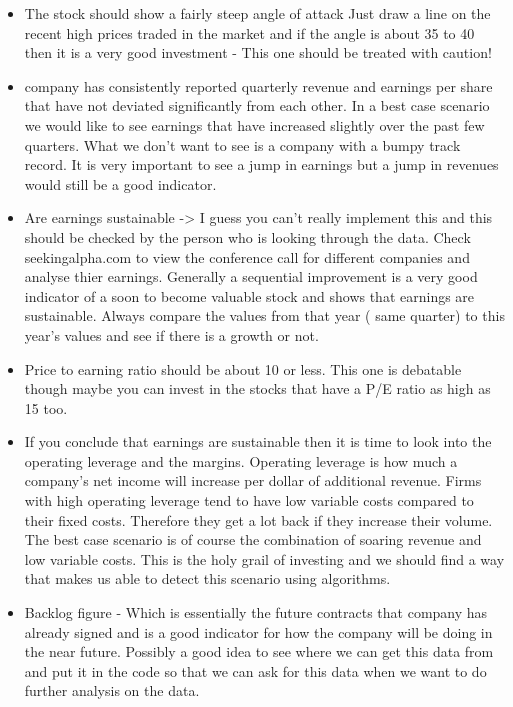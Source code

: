 \documentclass[12 pt]{article}
\begin{document}
\begin{itemize}
\item The stock  should show a fairly steep angle of attack 
Just draw a line on the recent high prices traded in the market and if the angle is about 35 to 40 then it is a very good investment - This one should be treated with caution!

\item company has consistently reported quarterly revenue and earnings per share that have not deviated significantly from each other. In a best case scenario we would like to see earnings that have increased slightly over the past few quarters.  What we don't want to see is a company with a bumpy track record. It is very important to see a jump in earnings but a jump in revenues would still be a good indicator.

\item Are earnings sustainable -> I guess you can’t really implement this and this should be checked by the person who is looking through the data.  Check seekingalpha.com to view the conference call for different companies and analyse thier earnings. Generally a sequential improvement is a very good indicator of a soon to become valuable stock and shows that earnings are sustainable. Always compare the values from that year ( same quarter) to this year’s values and see if there is a growth or not. 
\item Price to earning ratio should be about 10 or less. This one is debatable though maybe you can invest in the stocks that have a P/E ratio as high as 15 too.
\item If you conclude that earnings are sustainable then  it is time to look into the operating leverage and the margins. Operating leverage is how much a company's net income will increase per dollar of additional revenue. Firms with high operating leverage tend to have low variable costs compared to their fixed costs. Therefore they get a lot back if they increase their volume. The best case scenario is of course the combination of soaring revenue and low variable costs. This is the holy grail of investing and we should find a way that makes us able to detect this scenario using algorithms.
\item  Backlog figure - Which is essentially the future contracts that company has already signed and is a good indicator for how the company will be doing in the near future. Possibly a good idea to see where we can get this data from and put it in the code so that we can ask for this data when we want to do further analysis on the data. 


\end{itemize}
\end{document}
